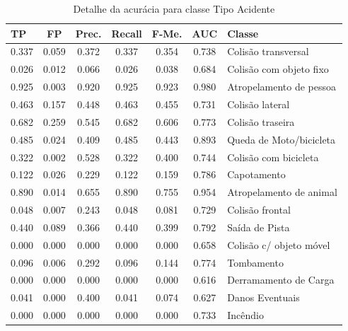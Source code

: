 \begin{enumerate}
		\begin{table}[!ht]
			\centering
			\caption{Detalhe da acurácia para classe Tipo Acidente}
			\vspace{1mm}
			\begin{tabular}{l|c|c|c|c|c|l}
				\hline
				\textbf{TP} & \textbf{FP} & \textbf{Prec.} & \textbf{Recall} & \textbf{F-Me.} & \textbf{AUC} & \textbf{Classe} \\
				\hline
				0.337 & 0.059 & 0.372 & 0.337 & 0.354 & 0.738 & Colisão transversal \\
				0.026 & 0.012 & 0.066 & 0.026 & 0.038 & 0.684 & Colisão com objeto fixo \\
				0.925 &	0.003 &	0.920 & 0.925 & 0.923 & 0.980 & Atropelamento de pessoa \\
				0.463 &	0.157 &	0.448 &	0.463 &	0.455 &	0.731 &	Colisão lateral \\
				0.682 &	0.259 & 0.545 & 0.682 & 0.606 & 0.773 & Colisão traseira \\
				0.485 & 0.024 & 0.409 & 0.485 & 0.443 & 0.893 & Queda de Moto/bicicleta \\
				0.322 & 0.002 & 0.528 & 0.322 & 0.400 & 0.744 & Colisão com bicicleta \\
				0.122 & 0.026 & 0.229 & 0.122 & 0.159 & 0.786 & Capotamento \\
				0.890 & 0.014 & 0.655 & 0.890 & 0.755 & 0.954 & Atropelamento de animal \\
				0.048 & 0.007 & 0.243 & 0.048 & 0.081 & 0.729 & Colisão frontal \\
				0.440 & 0.089 & 0.366 & 0.440 & 0.399 & 0.792 & Saída de Pista \\
				0.000 & 0.000 & 0.000 & 0.000 & 0.000 & 0.658 & Colisão c/ objeto móvel\\
				0.096 & 0.006 & 0.292 & 0.096 & 0.144 & 0.774 & Tombamento \\
				0.000 & 0.000 & 0.000 & 0.000 & 0.000 & 0.616 & Derramamento de Carga \\
				0.041 & 0.000 & 0.400 & 0.041 & 0.074 & 0.627 & Danos Eventuais \\
				0.000 & 0.000 & 0.000 & 0.000 & 0.000 & 0.733 & Incêndio \\	
			\end{tabular}
		\end{table}
		

\end{enumerate}
